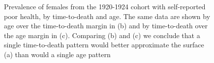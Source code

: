 \documentclass[12pt,oneside,letterpaper,doublespacing]{article}  %
\begin{document}
\begin{figure}[ht!]
    \caption{Prevalence of females from the 1920-1924 cohort with self-reported poor health, by time-to-death and age. The same data are shown by age over the time-to-death margin in (b) and by time-to-death over the age margin in (c). Comparing (b) and (c) we conclude that a single time-to-death pattern would better approximate the surface (a) than would a single age pattern}\label{fig:srhpoortal}
\end{figure}
 
\end{document}
